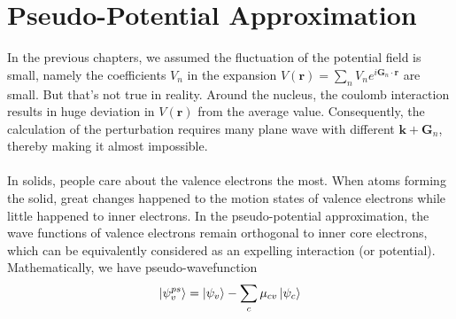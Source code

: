 \documentclass{article}
\begin{document}
\section{Pseudo-Potential Approximation}
In the previous chapters, we assumed the fluctuation of the potential field is small, namely the coefficients $V_n$ in the expansion $V(\mathbf{r})=\sum_n{V_n}e^{i\mathbf{G}_n\cdot\mathbf{r}}$ are small. But that's not true in reality. Around the nucleus, the coulomb interaction results in huge deviation in $V(\mathbf{r})$ from the average value. Consequently, the calculation of the perturbation requires many plane wave with different $\mathbf{k}+\mathbf{G}_n$, thereby making it almost impossible.\\
\\
In solids, people care about the valence electrons the most. When atoms forming the solid, great changes happened to the motion states of valence electrons while little happened to inner electrons. In the pseudo-potential approximation, the wave functions of valence electrons remain orthogonal to inner core electrons, which can be equivalently considered as an expelling interaction (or potential). Mathematically, we have pseudo-wavefunction\begin{equation}
    \ket{\psi_v^{ps}}=\ket{\psi_v}-\sum_c\mu_{cv}\ket{\psi_c}
\end{equation}
\end{document}
